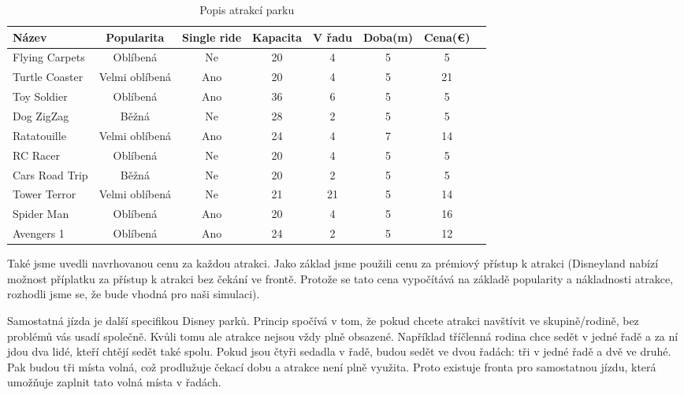 \documentclass[a4paper,12pt]{article}
\begin{document}
\begin{table}[h!]
	\centering
	\begin{tabular}{|l|c|c|c|c|c|c|c|}
		\hline
		\textbf{Název} &\textbf{Popularita}&\textbf{Single ride}&\textbf{Kapacita}&\textbf{V řadu}&\textbf{Doba(m)}&\textbf{Cena(€)}\\ \hline
		Flying Carpets        & Oblíbená         & Ne               & 20               & 4            & 5         & 5        \\ \hline
		Turtle Coaster        & Velmi oblíbená   & Ano              & 20               & 4            & 5         & 21       \\ \hline
		Toy Soldier           & Oblíbená         & Ano              & 36               & 6            & 5         & 5        \\ \hline
		Dog ZigZag            & Běžná            & Ne               & 28               & 2            & 5         & 5        \\ \hline
		Ratatouille           & Velmi oblíbená   & Ano              & 24               & 4            & 7         & 14       \\ \hline
		RC Racer              & Oblíbená         & Ne               & 20               & 4            & 5         & 5        \\ \hline
		Cars Road Trip        & Běžná            & Ne               & 20               & 2            & 5         & 5        \\ \hline
		Tower Terror          & Velmi oblíbená   & Ne               & 21               & 21           & 5         & 14       \\ \hline
		Spider Man            & Oblíbená         & Ano              & 20               & 4            & 5         & 16       \\ \hline
		Avengers 1            & Oblíbená         & Ano              & 24               & 2            & 5         & 12       \\ \hline
	\end{tabular}
	\caption{Popis atrakcí parku}
	\label{tab:attractions}
\end{table}

Také jsme uvedli navrhovanou cenu za každou atrakci. Jako základ jsme použili cenu za prémiový přístup k atrakci (Disneyland nabízí možnost příplatku za přístup k atrakci bez čekání ve frontě. Protože se tato cena vypočítává na základě popularity a nákladnosti atrakce, rozhodli jsme se, že bude vhodná pro naši simulaci).

Samostatná jízda je další specifikou Disney parků. Princip spočívá v tom, že pokud chcete atrakci navštívit ve skupině/rodině, bez problémů vás usadí společně. Kvůli tomu ale atrakce nejsou vždy plně obsazené. Například tříčlenná rodina chce sedět v jedné řadě a za ní jdou dva lidé, kteří chtějí sedět také spolu. Pokud jsou čtyři sedadla v řadě, budou sedět ve dvou řadách: tři v jedné řadě a dvě ve druhé. Pak budou tři místa volná, což prodlužuje čekací dobu a atrakce není plně využita. Proto existuje fronta pro samostatnou jízdu, která umožňuje zaplnit tato volná místa v řadách.
\end{document}
